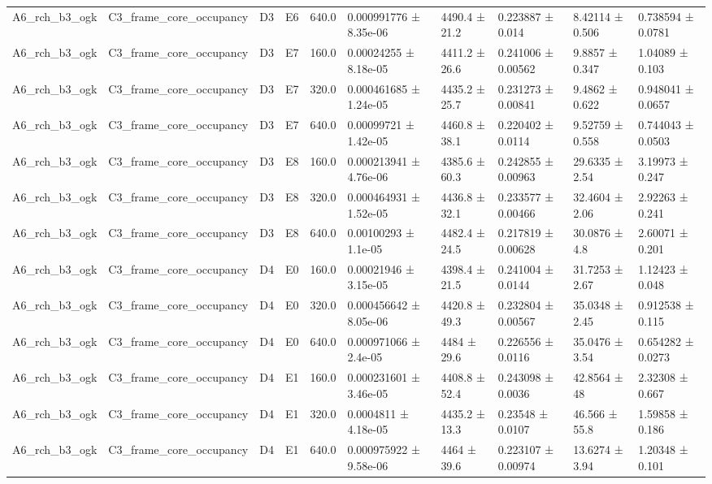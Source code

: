 \begin{table}
\begin{tabular}{llllllllll}
A6\_rch\_b3\_ogk & C3\_frame\_core\_occupancy & D3 & E6 & 640.0 & 0.000991776 ± 8.35e-06 & 4490.4 ± 21.2 & 0.223887 ± 0.014 & 8.42114 ± 0.506 & 0.738594 ± 0.0781 \\
A6\_rch\_b3\_ogk & C3\_frame\_core\_occupancy & D3 & E7 & 160.0 & 0.00024255 ± 8.18e-05 & 4411.2 ± 26.6 & 0.241006 ± 0.00562 & 9.8857 ± 0.347 & 1.04089 ± 0.103 \\
A6\_rch\_b3\_ogk & C3\_frame\_core\_occupancy & D3 & E7 & 320.0 & 0.000461685 ± 1.24e-05 & 4435.2 ± 25.7 & 0.231273 ± 0.00841 & 9.4862 ± 0.622 & 0.948041 ± 0.0657 \\
A6\_rch\_b3\_ogk & C3\_frame\_core\_occupancy & D3 & E7 & 640.0 & 0.00099721 ± 1.42e-05 & 4460.8 ± 38.1 & 0.220402 ± 0.0114 & 9.52759 ± 0.558 & 0.744043 ± 0.0503 \\
A6\_rch\_b3\_ogk & C3\_frame\_core\_occupancy & D3 & E8 & 160.0 & 0.000213941 ± 4.76e-06 & 4385.6 ± 60.3 & 0.242855 ± 0.00963 & 29.6335 ± 2.54 & 3.19973 ± 0.247 \\
A6\_rch\_b3\_ogk & C3\_frame\_core\_occupancy & D3 & E8 & 320.0 & 0.000464931 ± 1.52e-05 & 4436.8 ± 32.1 & 0.233577 ± 0.00466 & 32.4604 ± 2.06 & 2.92263 ± 0.241 \\
A6\_rch\_b3\_ogk & C3\_frame\_core\_occupancy & D3 & E8 & 640.0 & 0.00100293 ± 1.1e-05 & 4482.4 ± 24.5 & 0.217819 ± 0.00628 & 30.0876 ± 4.8 & 2.60071 ± 0.201 \\
A6\_rch\_b3\_ogk & C3\_frame\_core\_occupancy & D4 & E0 & 160.0 & 0.00021946 ± 3.15e-05 & 4398.4 ± 21.5 & 0.241004 ± 0.0144 & 31.7253 ± 2.67 & 1.12423 ± 0.048 \\
A6\_rch\_b3\_ogk & C3\_frame\_core\_occupancy & D4 & E0 & 320.0 & 0.000456642 ± 8.05e-06 & 4420.8 ± 49.3 & 0.232804 ± 0.00567 & 35.0348 ± 2.45 & 0.912538 ± 0.115 \\
A6\_rch\_b3\_ogk & C3\_frame\_core\_occupancy & D4 & E0 & 640.0 & 0.000971066 ± 2.4e-05 & 4484 ± 29.6 & 0.226556 ± 0.0116 & 35.0476 ± 3.54 & 0.654282 ± 0.0273 \\
A6\_rch\_b3\_ogk & C3\_frame\_core\_occupancy & D4 & E1 & 160.0 & 0.000231601 ± 3.46e-05 & 4408.8 ± 52.4 & 0.243098 ± 0.0036 & 42.8564 ± 48 & 2.32308 ± 0.667 \\
A6\_rch\_b3\_ogk & C3\_frame\_core\_occupancy & D4 & E1 & 320.0 & 0.0004811 ± 4.18e-05 & 4435.2 ± 13.3 & 0.23548 ± 0.0107 & 46.566 ± 55.8 & 1.59858 ± 0.186 \\
A6\_rch\_b3\_ogk & C3\_frame\_core\_occupancy & D4 & E1 & 640.0 & 0.000975922 ± 9.58e-06 & 4464 ± 39.6 & 0.223107 ± 0.00974 & 13.6274 ± 3.94 & 1.20348 ± 0.101 \\

\end{tabular}
\end{table}
